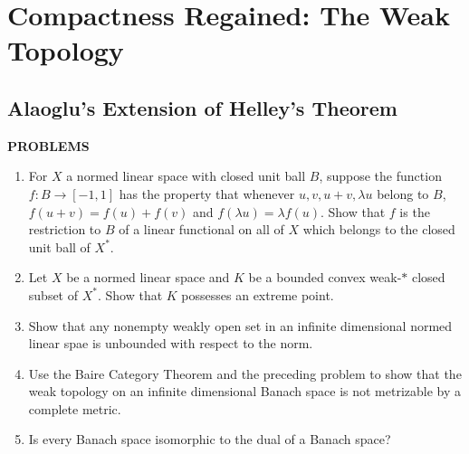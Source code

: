 \chapter{Compactness Regained: The Weak Topology}

\section{Alaoglu's Extension of Helley's Theorem}
\begin{center}
	\textbf{PROBLEMS}
\end{center}
\begin{enumerate}
	\setcounter{enumi}{0}
    \item For $X$ a normed linear space with closed unit ball $B$, suppose the function $f:B\to[-1,1]$ has the property that whenever $u,v,u+v,\lambda u$ belong to $B$, $f(u+v)=f(u)+f(v)$ and $f(\lambda u)=\lambda f(u)$.
    Show that $f$ is the restriction to $B$ of a linear functional on all of $X$ which belongs to the closed unit ball of $X^*$.
    \item Let $X$ be a normed linear space and $K$ be a bounded convex weak-$*$ closed subset of $X^*$. Show that $K$ possesses an extreme point.
    \item Show that any nonempty weakly open set in an infinite dimensional normed linear spae is unbounded with respect to the norm.
    \item Use the Baire Category Theorem and the preceding problem to show that the weak topology on an infinite dimensional Banach space is not metrizable by a complete metric.
    \item Is every Banach space isomorphic to the dual of a Banach space?
\end{enumerate}

